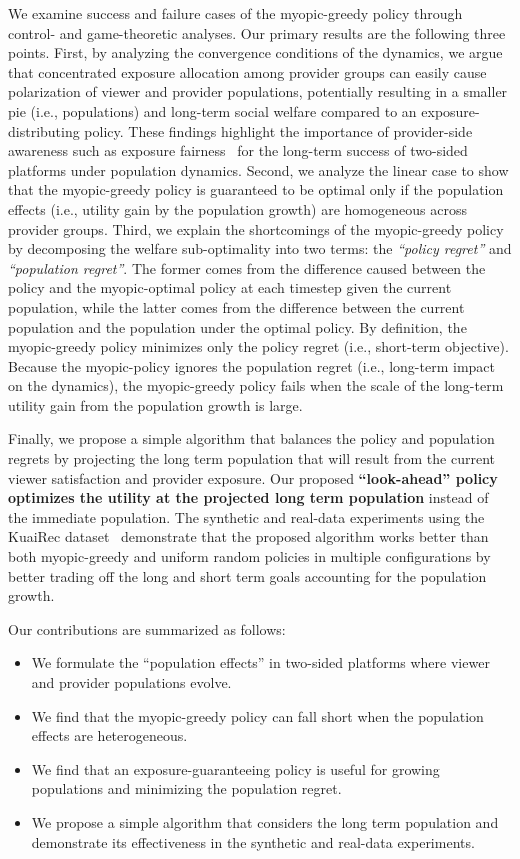 We examine success and failure cases of the myopic-greedy policy through control- and game-theoretic analyses. Our primary results are the following three points. 
First, by analyzing the convergence conditions of the dynamics, we argue that concentrated exposure allocation among provider groups can easily cause polarization of viewer and provider populations, potentially resulting in a smaller pie (i.e., populations) and long-term social welfare compared to an exposure-distributing policy.
These findings highlight the importance of provider-side awareness such as exposure fairness~\citep{singh2018fairness} for the long-term success of two-sided platforms under population dynamics. 
Second, we analyze the linear case to show that the myopic-greedy policy is guaranteed to be optimal only if the population effects (i.e., utility gain by the population growth) are homogeneous across provider groups. 
Third, we explain the shortcomings of the myopic-greedy policy by decomposing the welfare sub-optimality into two terms:
the \textit{``policy regret''} and \textit{``population regret''}. The former comes from the difference caused between the policy and the myopic-optimal policy at each timestep given the current population, while the latter comes from the difference between the current population and the population under the optimal policy. By definition, the myopic-greedy policy minimizes only the policy regret (i.e., short-term objective).
Because the myopic-policy ignores the population regret (i.e., long-term impact on the dynamics), the myopic-greedy policy fails when the scale of the long-term utility gain from the population growth is large. 

Finally, we propose a simple algorithm that balances the policy and population regrets by projecting the long term population that will result from the current viewer satisfaction and provider exposure. Our proposed \textbf{``look-ahead'' policy optimizes the utility at the projected long term population} instead of the immediate population. The synthetic and real-data experiments using the KuaiRec dataset~\citep{gao2022kuairec} demonstrate that the proposed algorithm works better than both myopic-greedy and uniform random policies in multiple configurations by better trading off the long and short term goals accounting for the population growth.

Our contributions are summarized as follows:
\begin{itemize}
    \item We formulate the ``population effects'' in two-sided platforms where viewer and provider populations evolve.
    \item We find that the myopic-greedy policy can fall short when the population effects are heterogeneous.
    \item We find that an exposure-guaranteeing policy is useful for growing populations and minimizing the population regret.
    \item We propose a simple algorithm that considers the long term population and demonstrate its effectiveness in the synthetic and real-data experiments.
\end{itemize}

